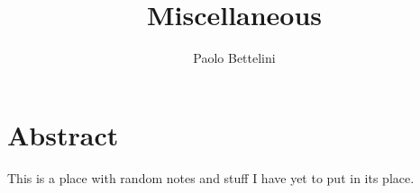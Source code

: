 \documentclass[a4paper]{article}
\title{Miscellaneous}
\author{Paolo Bettelini}
\date{}
\begin{document}
\maketitle
\tableofcontents
\pagebreak

\section{Abstract}

This is a place with random notes and stuff I have yet to put
in its place.

\pagebreak
\end{document}
